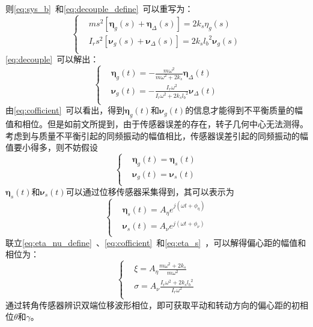 \documentclass[
  lang=cn,
  degree=master,
  openany,oneside
]{nuaathesis}
\begin{document}
则\autoref{eq:sys_b}~和\autoref{eq:decouple_define}~可以重写为：
\begin{equation}
\label{eq:decouple}
\left\{
\begin{aligned}
& ms^2\left[ \boldsymbol{\eta} _g(s)+\boldsymbol{\eta}_{\Delta}(s) \right] = 2k_s\eta _g(s)\\
& {I_r}s^2\left[ \boldsymbol{\nu} _g(s)+\boldsymbol{\nu}_{\Delta}(s) \right] = 2k_s{l_b}^2\boldsymbol{\nu} _g(s)\\
\end{aligned}
\right.
\end{equation}
\autoref{eq:decouple}~可以解出：
\begin{equation}
\label{eq:cofficient}
\left\{
\begin{aligned}
& \boldsymbol{\eta} _g (t) = -\frac{m{\omega}^2}{m{\omega}^2+2k_s}\boldsymbol{\eta} _{\Delta}(t)\\
& \boldsymbol{\nu} _g (t) = -\frac{I_r{\omega}^2}{I_r{\omega}^2+2k_s{l_b}^2}\boldsymbol{\nu} _{\Delta}(t)\\
\end{aligned}
\right.
\end{equation}
由\autoref{eq:cofficient}~可以看出，得到$\boldsymbol{\eta} _g(t)$和$\boldsymbol{\nu} _g(t)$的信息才能得到不平衡质量的幅值和相位。但是如前文所提到，由于传感器误差的存在，转子几何中心无法测得。考虑到与质量不平衡引起的同频振动的幅值相比，传感器误差引起的同频振动的幅值要小得多，则不妨假设
\begin{equation}
\label{eq:assumption}
\left\{
\begin{aligned}
& \boldsymbol{\eta} _g (t) = \boldsymbol{\eta} _s (t)\\
& \boldsymbol{\nu} _g (t) = \boldsymbol{\nu} _s (t)  \\
\end{aligned}
\right.
\end{equation}
$\boldsymbol{\eta} _s(t)$和$\boldsymbol{\nu} _s(t)$可以通过位移传感器采集得到，其可以表示为
\begin{equation}
\label{eq:eta_s}
\left\{
\begin{aligned}
& \boldsymbol{\eta} _s (t) = A_{{\eta}}e^{j(\omega t + \phi _{\eta})} \\
& \boldsymbol{\nu} _s (t) = A_{{\nu}}e^{j(\omega t + \phi _{\nu})} \\
\end{aligned}
\right.
\end{equation}
联立\autoref{eq:eta_nu_define}~、\autoref{eq:cofficient}~和\autoref{eq:eta_s}~，可以解得偏心距的幅值和相位为：
\begin{equation}
\left\{
\begin{aligned}
& \xi = A_{\eta}\frac{m{\omega}^2 + 2k_s}{m{\omega}^2}\\
& \sigma = A_{\nu}\frac{I_r{\omega}^2 + 2k_s{l_b}^2}{I_r{\omega}^2}\\
\end{aligned}
\right.
\end{equation}
通过转角传感器辨识双端位移波形相位，即可获取平动和转动方向的偏心距的初相位$\theta$和$\gamma$。
\end{document}
